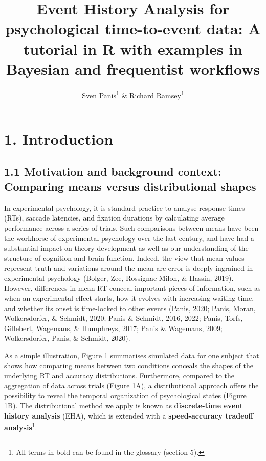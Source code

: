 \documentclass[
  english,
  man, donotrepeattitle,floatsintext]{apa6}
\title{Event History Analysis for psychological time-to-event data: A tutorial in R with examples in Bayesian and frequentist workflows}
\author{Sven Panis\textsuperscript{1} \& Richard Ramsey\textsuperscript{1}}
\date{}
\affiliation{\vspace{0.5cm}\textsuperscript{1} ETH Zürich}
\begin{document}
\maketitle

\section{1. Introduction}\label{introduction}

\subsection{1.1 Motivation and background context: Comparing means versus distributional shapes}\label{motivation-and-background-context-comparing-means-versus-distributional-shapes}

In experimental psychology, it is standard practice to analyse response times (RTs), saccade latencies, and fixation durations by calculating average performance across a series of trials. Such comparisons between means have been the workhorse of experimental psychology over the last century, and have had a substantial impact on theory development as well as our understanding of the structure of cognition and brain function. Indeed, the view that mean values represent truth and variations around the mean are error is deeply ingrained in experimental psychology (Bolger, Zee, Rossignac-Milon, \& Hassin, 2019). However, differences in mean RT conceal important pieces of information, such as when an experimental effect starts, how it evolves with increasing waiting time, and whether its onset is time-locked to other events (Panis, 2020; Panis, Moran, Wolkersdorfer, \& Schmidt, 2020; Panis \& Schmidt, 2016, 2022; Panis, Torfs, Gillebert, Wagemans, \& Humphreys, 2017; Panis \& Wagemans, 2009; Wolkersdorfer, Panis, \& Schmidt, 2020).

As a simple illustration, Figure 1 summarises simulated data for one subject that shows how comparing means between two conditions conceals the shapes of the underlying RT and accuracy distributions. Furthermore, compared to the aggregation of data across trials (Figure 1A), a distributional approach offers the possibility to reveal the temporal organization of psychological states (Figure 1B). The distributional method we apply is known as \textbf{discrete-time event history analysis} (EHA), which is extended with a \textbf{speed-accuracy tradeoff analysis}\footnote{All terms in bold can be found in the glossary (section 5).}.
\end{document}
